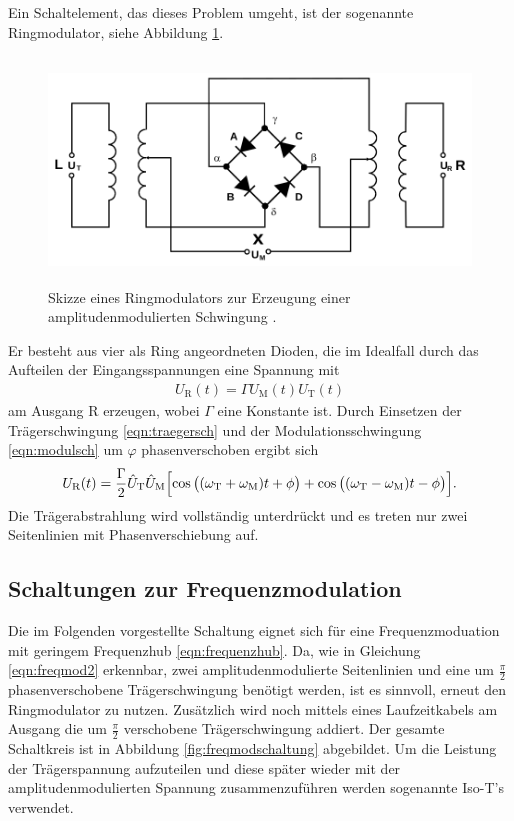Ein Schaltelement, das dieses Problem umgeht, ist der sogenannte Ringmodulator, siehe Abbildung \ref{fig:ringamplmodschaltung}.
\begin{figure}
  \centering
  \includegraphics[height=6cm]{JasperErsterSchultag/ringamplmodschaltung.png}
  \caption{Skizze eines Ringmodulators zur Erzeugung einer amplitudenmodulierten Schwingung \cite{anleitung}.}
  \label{fig:ringamplmodschaltung}
\end{figure}
Er besteht aus vier als Ring angeordneten Dioden, die im Idealfall durch das Aufteilen der Eingangsspannungen
eine Spannung mit
\begin{align}
  U_\text{R}(t) = \Gamma U_\text{M}(t) U_\text{T}(t)
\end{align}
am Ausgang R erzeugen, wobei $\Gamma$ eine Konstante ist.
Durch Einsetzen der Trägerschwingung \eqref{eqn:traegersch} und der Modulationsschwingung \eqref{eqn:modulsch} um $\varphi$
phasenverschoben ergibt sich
\begin{align}
  U_\text{R}(t) = \frac{\Gamma}{2} \hat{U}_\text{T} \hat{U}_\text{M} \Bigl[\cos{\bigl((\omega_\text{T}+\omega_\text{M})t + \phi \bigr)} + \cos{\bigl((\omega_\text{T}-\omega_\text{M})t - \phi \bigr)} \Bigr].
\end{align}
Die Trägerabstrahlung wird vollständig unterdrückt und es treten nur zwei Seitenlinien mit Phasenverschiebung auf.

\subsection{Schaltungen zur Frequenzmodulation}

Die im Folgenden vorgestellte Schaltung eignet sich für eine Frequenzmoduation mit geringem Frequenzhub \eqref{eqn:frequenzhub}.
Da, wie in Gleichung \eqref{eqn:freqmod2} erkennbar, zwei amplitudenmodulierte Seitenlinien und eine um $\frac{\pi}{2}$ phasenverschobene Trägerschwingung
benötigt werden, ist es sinnvoll, erneut den Ringmodulator zu nutzen. Zusätzlich wird noch mittels eines Laufzeitkabels am Ausgang die
um $\frac{\pi}{2}$ verschobene Trägerschwingung addiert. Der gesamte Schaltkreis ist in Abbildung \ref{fig:freqmodschaltung} abgebildet.
Um die Leistung der Trägerspannung aufzuteilen und diese später wieder mit der amplitudenmodulierten Spannung zusammenzuführen werden
sogenannte Iso-T's verwendet.

